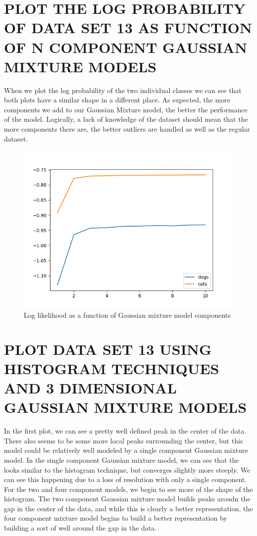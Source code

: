 \documentclass{article}
\begin{document}
\section{\MakeUppercase{Plot the log probability of data set 13 as function of n component Gaussian mixture models}}
When we plot the log probability of the two individual classes we can see that both plots have a similar shape in a different place. As expected, the more components we add to our Gaussian Mixture model, the better the performance of the model. Logically, a lack of knowledge of the dataset should mean that the more components there are, the better outliers are handled as well as the regular dataset.
\begin{figure}[!htb]
	\centering
	\begin{minipage}{0.49\textwidth}
			\centering
			\includegraphics[width=1\linewidth]{../q1to6pics/q5.png}
			\caption{Log likelihood as a function of Gaussian mixture model components}
	\end{minipage}\hfill
\end{figure}
\pagebreak
\section{\MakeUppercase{Plot data set 13 using histogram techniques and 3 dimensional Gaussian mixture models}}
In the first plot, we can see a pretty well defined peak in the center of the data. There also seems to be some more local peaks surrounding the center, but this model could be relatively well modeled by a single component Gaussian mixture model. In the single component Gaussian mixture model, we can see that the looks similar to the histogram technique, but converges slightly more steeply. We can see this happening due to a loss of resolution with only a single component. For the two and four component models, we begin to see more of the shape of the histogram. The two component Gaussian mixture model builds peaks aroudn the gap in the center of the data, and while this is clearly a better representation, the four component mixture model begins to build a better representation by building a sort of well around the gap in the data.
\end{document}
